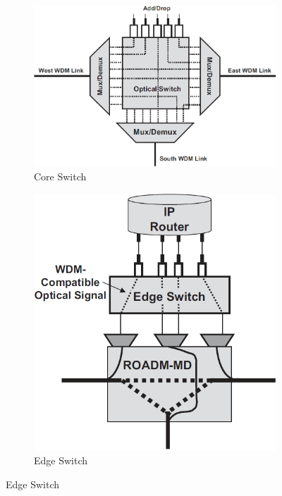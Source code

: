 \documentclass[10pt,letterpaper]{article}
\newcommand{\Q}[1]{\textbf{Question #1)}}
\newcommand{\nl}{\newline\newline}
\begin{document}
\begin{figure}[ht]
\centering
\begin{subfigure}{0.49\textwidth}
\centering
\includegraphics[scale=0.35]{Core_Switch}
\caption{Core Switch}
\end{subfigure}
\begin{subfigure}{0.49\textwidth}
\centering
\includegraphics[scale=0.4]{Edge_Switch}
\caption{Edge Switch}
\end{subfigure}
\end{figure}
\end{document}
